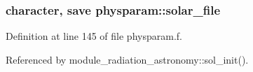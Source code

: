 \subsubsection[{\texorpdfstring{solar\+\_\+file}{solar_file}}]{\setlength{\rightskip}{0pt plus 5cm}character, save physparam\+::solar\+\_\+file}\hypertarget{namespacephysparam_a6472b7762518054a168d4aa915da38f8}{}\label{namespacephysparam_a6472b7762518054a168d4aa915da38f8}


Definition at line 145 of file physparam.\+f.



Referenced by module\+\_\+radiation\+\_\+astronomy\+::sol\+\_\+init().

